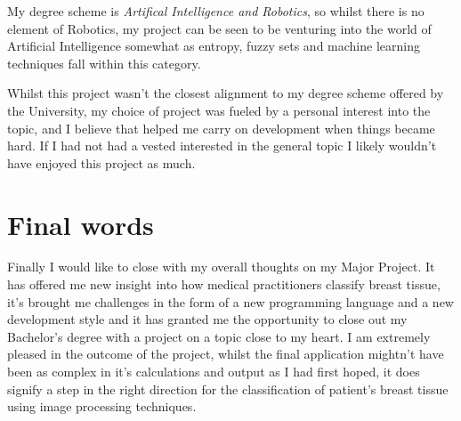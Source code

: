 My degree scheme is \textit{Artifical Intelligence and Robotics}, so whilst there is no element of Robotics, my project can be seen to be venturing into the world of Artificial Intelligence somewhat as entropy, fuzzy sets and machine learning techniques fall within this category.

Whilst this project wasn't the closest alignment to my degree scheme offered by the University, my choice of project was fueled by a personal interest into the topic, and I believe that helped me carry on development when things became hard. If I had not had a vested interested in the general topic I likely wouldn't have enjoyed this project as much.

\section{Final words}

Finally I would like to close with my overall thoughts on my Major Project. It has offered me new insight into how medical practitioners classify breast tissue, it's brought me challenges in the form of a new programming language and a new development style and it has granted me the opportunity to close out my Bachelor's degree with a project on a topic close to my heart. I am extremely pleased in the outcome of the project, whilst the final application mightn't have been as complex in it's calculations and output as I had first hoped, it does signify a step in the right direction for the classification of patient's breast tissue using image processing techniques.
